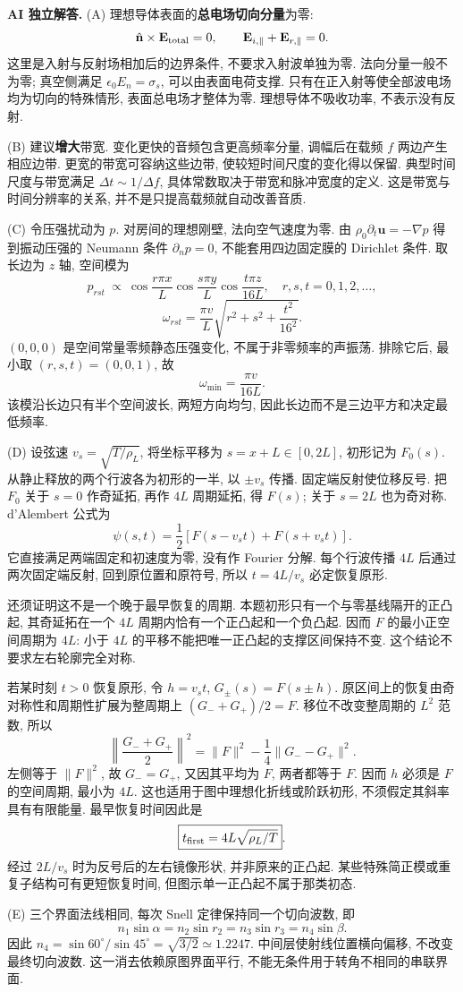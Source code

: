 \begin{solution}
\textbf{AI 独立解答.}
(A) 理想导体表面的\textbf{总电场切向分量}为零:
\[
\hat{\mathbf n}\times\mathbf E_{\rm total}=0,\qquad
\mathbf E_{i,\parallel}+\mathbf E_{r,\parallel}=0.
\]
这里是入射与反射场相加后的边界条件, 不要求入射波单独为零. 法向分量一般不为零; 真空侧满足 $\epsilon_0E_n=\sigma_s$, 可以由表面电荷支撑. 只有在正入射等使全部波电场均为切向的特殊情形, 表面总电场才整体为零. 理想导体不吸收功率, 不表示没有反射.

(B) 建议\textbf{增大}带宽. 变化更快的音频包含更高频率分量, 调幅后在载频 $f$ 两边产生相应边带. 更宽的带宽可容纳这些边带, 使较短时间尺度的变化得以保留. 典型时间尺度与带宽满足 $\Delta t\sim1/\Delta f$, 具体常数取决于带宽和脉冲宽度的定义. 这是带宽与时间分辨率的关系, 并不是只提高载频就自动改善音质.

(C) 令压强扰动为 $p$. 对房间的理想刚壁, 法向空气速度为零. 由 $\rho_0\partial_t\mathbf u=-\nabla p$ 得到振动压强的 Neumann 条件 $\partial_np=0$, 不能套用四边固定膜的 Dirichlet 条件. 取长边为 $z$ 轴, 空间模为
\[
p_{rst}\ \propto\ \cos\frac{r\pi x}{L}\cos\frac{s\pi y}{L}\cos\frac{t\pi z}{16L},
\quad r,s,t=0,1,2,\ldots,
\]
\[
\omega_{rst}=\frac{\pi v}{L}\sqrt{r^2+s^2+\frac{t^2}{16^2}}.
\]
$(0,0,0)$ 是空间常量零频静态压强变化, 不属于非零频率的声振荡. 排除它后, 最小取 $(r,s,t)=(0,0,1)$, 故
\[
\boxed{\omega_{\min}=\frac{\pi v}{16L}}.
\]
该模沿长边只有半个空间波长, 两短方向均匀, 因此长边而不是三边平方和决定最低频率.

(D) 设弦速 $v_s=\sqrt{T/\rho_L}$, 将坐标平移为 $s=x+L\in[0,2L]$, 初形记为 $F_0(s)$. 从静止释放的两个行波各为初形的一半, 以 $\pm v_s$ 传播. 固定端反射使位移反号. 把 $F_0$ 关于 $s=0$ 作奇延拓, 再作 $4L$ 周期延拓, 得 $F(s)$; 关于 $s=2L$ 也为奇对称. d'Alembert 公式为
\[
\psi(s,t)=\frac12[F(s-v_st)+F(s+v_st)].
\]
它直接满足两端固定和初速度为零, 没有作 Fourier 分解. 每个行波传播 $4L$ 后通过两次固定端反射, 回到原位置和原符号, 所以 $t=4L/v_s$ 必定恢复原形.

还须证明这不是一个晚于最早恢复的周期. 本题初形只有一个与零基线隔开的正凸起, 其奇延拓在一个 $4L$ 周期内恰有一个正凸起和一个负凸起. 因而 $F$ 的最小正空间周期为 $4L$: 小于 $4L$ 的平移不能把唯一正凸起的支撑区间保持不变. 这个结论不要求左右轮廓完全对称.

若某时刻 $t>0$ 恢复原形, 令 $h=v_st$, $G_\pm(s)=F(s\pm h)$. 原区间上的恢复由奇对称性和周期性扩展为整周期上 $(G_-+G_+)/2=F$. 移位不改变整周期的 $L^2$ 范数, 所以
\[
\left\|\frac{G_-+G_+}{2}\right\|^2
=\|F\|^2-\frac14\|G_--G_+\|^2.
\]
左侧等于 $\|F\|^2$, 故 $G_-=G_+$, 又因其平均为 $F$, 两者都等于 $F$. 因而 $h$ 必须是 $F$ 的空间周期, 最小为 $4L$. 这也适用于图中理想化折线或阶跃初形, 不须假定其斜率具有有限能量. 最早恢复时间因此是
\[
\boxed{t_{\rm first}=4L\sqrt{\rho_L/T}}.
\]
经过 $2L/v_s$ 时为反号后的左右镜像形状, 并非原来的正凸起. 某些特殊简正模或重复子结构可有更短恢复时间, 但图示单一正凸起不属于那类初态.

(E) 三个界面法线相同, 每次 Snell 定律保持同一个切向波数, 即
\[
n_1\sin\alpha=n_2\sin r_2=n_3\sin r_3=n_4\sin\beta.
\]
因此 $n_4=\sin60^\circ/\sin45^\circ=\sqrt{3/2}\simeq1.2247$. 中间层使射线位置横向偏移, 不改变最终切向波数. 这一消去依赖原图界面平行, 不能无条件用于转角不相同的串联界面.
\end{solution}

